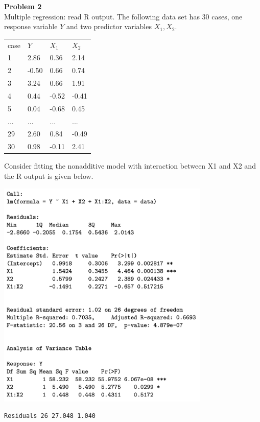 \documentclass{article}
\newenvironment{problem}[2][Problem]
    { \begin{mdframed}[backgroundcolor=gray!20] \textbf{#1 #2} \\}
    {  \end{mdframed}}
\begin{document}
\begin{problem}{2}
Multiple regression: read R output. The following data set has 30 cases, one response
variable $Y$ and two predictor variables $X_1, X_2$.

\begin{table}[H]
\centering
\begin{tabular}{llll}
case & $Y$     & $X_1$    & $X_2$    \\
1    & 2.86  & 0.36  & 2.14  \\
2    & -0.50 & 0.66  & 0.74  \\
3    & 3.24  & 0.66  & 1.91  \\
4    & 0.44  & -0.52 & -0.41 \\
5    & 0.04  & -0.68 & 0.45  \\
...  & ...   & ...   & ...   \\
29   & 2.60  & 0.84  & -0.49 \\
30   & 0.98  & -0.11 & 2.41 
\end{tabular}
\end{table}
Consider fitting the nonadditive model with interaction between X1 and X2 and the R output is given below.

\begin{center}
  \includegraphics[width=4in]{r_output.png}
\end{center}

\begin{verbatim}
Residuals 26 27.048 1.040
\end{verbatim}


\end{problem}
\end{document}
